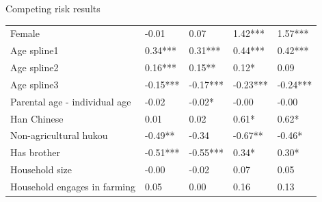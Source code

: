 \documentclass{beamer}
\begin{document}
\begin{frame}{Competing risk results}
\begin{table}[]
\begin{tabular}{@{}lllll@{}}
Female                                                                                      & -0.01                & 0.07                & 1.42***                                       & 1.57***                                       \\
Age spline1                                                                                 & 0.34***              & 0.31***             & 0.44***                                       & 0.42***                                       \\
Age spline2                                                                                 & 0.16***              & 0.15**              & 0.12*                                         & 0.09                                          \\
Age spline3                                                                                 & -0.15***             & -0.17***            & -0.23***                                      & -0.24***                                      \\
Parental age -   individual age                                                             & -0.02                & -0.02*              & -0.00                                         & -0.00                                         \\
Han Chinese                                                                                 & 0.01                 & 0.02                & 0.61*                                         & 0.62*                                         \\
Non-agricultural   hukou                                                                    & -0.49**              & -0.34               & -0.67**                                       & -0.46*                                        \\
Has brother                                                                                 & -0.51***             & -0.55***            & 0.34*                                         & 0.30*                                         \\
Household size                                                                              & -0.00                & -0.02               & 0.07                                          & 0.05                                          \\
Household   engages in farming                                                              & 0.05                 & 0.00                & 0.16                                          & 0.13                                          \\

\end{tabular}
\end{table}
\end{frame}
\end{document}
